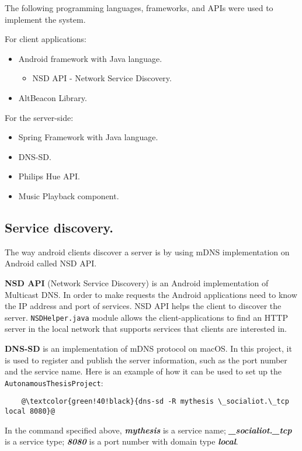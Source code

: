 The following programming languages, frameworks, and APIs were used to implement the system.

For client applications:
\begin{itemize}
    \item Android framework with Java language.
    \begin{itemize}
        \item NSD API - Network Service Discovery.
    \end{itemize}
    \item AltBeacon Library.
\end{itemize}

For the server-side:
\begin{itemize}
    \item Spring Framework with Java language.
    \item DNS-SD\@.
    \item Philips Hue API\@.
    \item Music Playback component.
\end{itemize}

\subsection{Service discovery.}
\label{subsec:service-discovery.}
The way android clients discover a server is by using mDNS implementation on Android called NSD API.

\textbf{NSD API} (Network Service Discovery) is an Android implementation of Multicast DNS\@.
In order to make requests the Android applications need to know the IP address and port of services.
NSD API helps the client to discover the server.
\texttt{NSDHelper.java} module allows the client-applications to find an HTTP server in the local network that supports
services that clients are interested in.

\textbf{DNS-SD} is an implementation of mDNS protocol on macOS\@.
In this project, it is used to register and publish the server information, such as the port number and the service name.
Here is an example of how it can be used to set up the \texttt{AutonamousThesisProject}:
\begin{lstlisting}
    @\textcolor{green!40!black}{dns-sd -R mythesis \_socialiot.\_tcp local 8080}@
\end{lstlisting}
In the command specified above, \textbf{\emph{mythesis}} is a service name;
\textbf{\emph{\_socialiot.\_tcp}} is a service type;
\textbf{\emph{8080}} is a port number with domain type \textbf{\emph{local}}.

